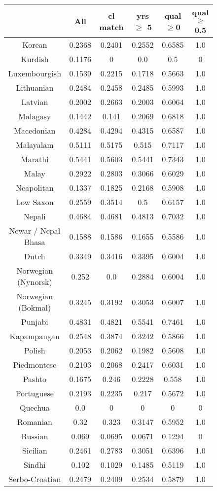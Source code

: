 \begin{figure}[h]
\centering
\begin{tabular}{cccccc}
&All&cl match&yrs $\geq$ 5&qual$\geq$0&qual$\geq$0.5\\
\hline\hline
Korean&0.2368&0.2401&0.2552&0.6585&1.0\\
Kurdish&0.1176&0&0.0&0.5&0\\
Luxembourgish&0.1539&0.2215&0.1718&0.5663&1.0\\
Lithuanian&0.2484&0.2458&0.2485&0.5993&1.0\\
Latvian&0.2002&0.2663&0.2003&0.6064&1.0\\
Malagasy&0.1442&0.141&0.2069&0.6818&1.0\\
Macedonian&0.4284&0.4294&0.4315&0.6587&1.0\\
Malayalam&0.5111&0.5175&0.515&0.7117&1.0\\
Marathi&0.5441&0.5603&0.5441&0.7343&1.0\\
Malay&0.2922&0.2803&0.3066&0.6029&1.0\\
Neapolitan&0.1337&0.1825&0.2168&0.5908&1.0\\
Low Saxon&0.2559&0.3514&0.5&0.6157&1.0\\
Nepali&0.4684&0.4681&0.4813&0.7032&1.0\\
Newar / Nepal Bhasa&0.1588&0.1586&0.1655&0.5586&1.0\\
Dutch&0.3349&0.3416&0.3395&0.6004&1.0\\
Norwegian (Nynorsk)&0.252&0.0&0.2884&0.6004&1.0\\
Norwegian (Bokmal)&0.3245&0.3192&0.3053&0.6007&1.0\\
Punjabi&0.4831&0.4821&0.5541&0.7461&1.0\\
Kapampangan&0.2548&0.3874&0.3242&0.5866&1.0\\
Polish&0.2053&0.2062&0.1982&0.5608&1.0\\
Piedmontese&0.2103&0.2068&0.2417&0.6031&1.0\\
Pashto&0.1675&0.246&0.2228&0.558&1.0\\
Portuguese&0.2193&0.2235&0.217&0.5672&1.0\\
Quechua&0.0&0&0&0&0\\
Romanian&0.32&0.323&0.3147&0.5952&1.0\\
Russian&0.069&0.0695&0.0671&0.1294&0\\
Sicilian&0.2461&0.2783&0.3051&0.6396&1.0\\
Sindhi&0.102&0.1029&0.1485&0.5119&1.0\\
Serbo-Croatian&0.2479&0.2409&0.2534&0.5879&1.0\\

\end{tabular}
\end{figure}
